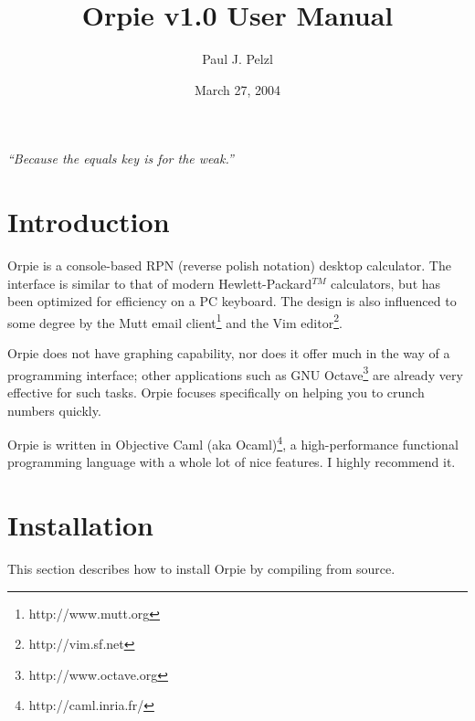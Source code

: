 \documentclass[11pt,notitlepage]{article}
\begin{document}
\title{Orpie v1.0 User Manual}
\author{Paul J. Pelzl}
\date{March 27, 2004}
\maketitle

\begin{center}
{\em ``Because the equals key is for the weak.''}
\end{center}


\section{Introduction}
Orpie is a console-based RPN (reverse polish notation) desktop
calculator.  The interface is similar to that of modern
Hewlett-Packard${}^{TM}$ calculators, but has been optimized for efficiency on
a PC keyboard.  The design is also influenced to some degree by the 
Mutt email client\footnote{http://www.mutt.org} 
and the 
Vim editor\footnote{http://vim.sf.net}.

Orpie does not have graphing capability, nor does it offer much in the way of a
programming interface; other applications such as 
GNU Octave\footnote{http://www.octave.org} 
are already very effective for such tasks.  Orpie focuses specifically on
helping you to crunch numbers quickly.

Orpie is written in 
Objective Caml (aka Ocaml)\footnote{http://caml.inria.fr/},
a high-performance functional programming language with a whole lot of nice
features.  I highly recommend it.

\section{Installation}
This section describes how to install Orpie by compiling from source.
\end{document}
